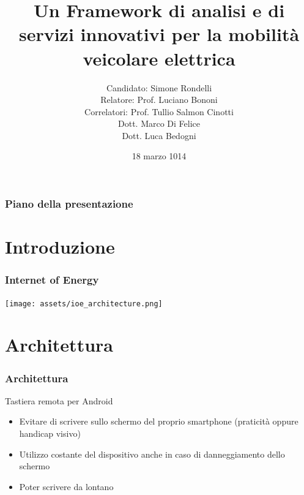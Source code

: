 \documentclass[11pt]{beamer}
\author{\texorpdfstring{Candidato: Simone Rondelli\\Relatore: Prof. Luciano Bononi\\Correlatori: Prof. Tullio Salmon Cinotti\\Dott. Marco Di Felice\\Dott. Luca Bedogni}{Candidato}}
\title{Un Framework di analisi e di servizi innovativi per la mobilità veicolare elettrica}
\date{18 marzo 1014}
\institute{Università di Bologna}
\begin{document}
\begin{frame}
	\maketitle
\end{frame}

\begin{frame}
	\frametitle{Piano della presentazione}
	\tableofcontents
\end{frame}

\section{Introduzione}
\begin{frame}
	\frametitle{Internet of Energy}
	\texttt{[image: assets/ioe\_architecture.png]}
\end{frame}

\section{Architettura}
\begin{frame}
	\frametitle{Architettura}
	
	\begin{problock}{Tastiera remota per Android}
		\vspace{0.5em}
		\begin{itemize}[<+->]

	   		\item Evitare di scrivere sullo schermo del proprio smartphone \newline(praticità 	oppure handicap visivo)
			\vspace{0.5em}
	    	\item Utilizzo costante del dispositivo anche in caso di danneggiamento dello schermo
			\vspace{0.5em}
	    	\item Poter scrivere da lontano

		\end{itemize}
    \end{problock}
\end{frame}
\end{document}

